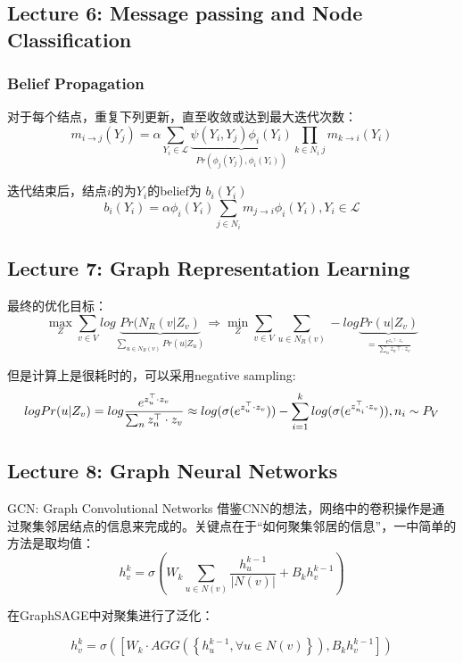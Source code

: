 \subsection{Lecture 6: Message passing and Node Classification}
\subsubsection{Belief Propagation}

对于每个结点，重复下列更新，直至收敛或达到最大迭代次数：
$$
m_{i\to j}(Y_j) = \alpha \sum_{Y_i \in \mathcal{L}} \underbrace{\psi (Y_i, Y_j)\phi_i(Y_i) }_{Pr(\phi_j(Y_j) , \phi_i(Y_i)) }\prod_{k\in N_i \ j}m_{k\to i}(Y_i)  
$$

迭代结束后，结点$i$的为$Y_i$的belief为 $b_i(Y_i)$
$$
b_i(Y_i) = \alpha \phi_i(Y_i)\sum_{j\in N_i} m_{j \to i}\phi_i(Y_i), Y_i \in \mathcal{L}
$$

\subsection{Lecture 7: Graph Representation Learning}

最终的优化目标：
$$
\mathop{ max}_Z  \sum_{v \in V} log \underbrace{Pr(N_R(v | Z_v)}_{\sum_{u\in N_R(v)}Pr(u|Z_u) }   \Longrightarrow \mathop{min}_{Z} \sum_{v\in V} \sum_{u\in N_R(v)} -log\underbrace{Pr(u | Z_v) }_{=\frac{e^{z_u\top \cdot z_v}}{\sum_n z_n \top \cdot z_v} }
$$

但是计算上是很耗时的，可以采用negative sampling:
$$
log Pr(u | Z_v) \\
= log\frac{e^{z_u ^ \top \cdot z_v}}{\sum_n z_n ^ \top \cdot z_v} \\
\approx log (\sigma (e^{z_u^\top \cdot z_v})) - \sum_{i=1}^{k}log(\sigma( e^{z_{n_{i}}^\top \cdot z_v})) , n_i \sim P_V 
$$


\subsection{Lecture 8: Graph Neural Networks}

GCN: Graph Convolutional Networks
借鉴CNN的想法，网络中的卷积操作是通过聚集邻居结点的信息来完成的。关键点在于“如何聚集邻居的信息”，一中简单的方法是取均值：
$$
h_{v}^{k} = \sigma(W_k\sum_{u \in N(v)}\frac{h_{u}^{k-1}}{|N(v)|}  +B_kh_{v}^{k-1}) 
$$

在GraphSAGE中对聚集进行了泛化：

$$
h_{v}^{k} = \sigma([W_k\cdot AGG(\left\{ h_{u}^{k-1},\forall  u \in N(v) \right\}  ),B_kh_{v}^{k-1}]) 
$$


